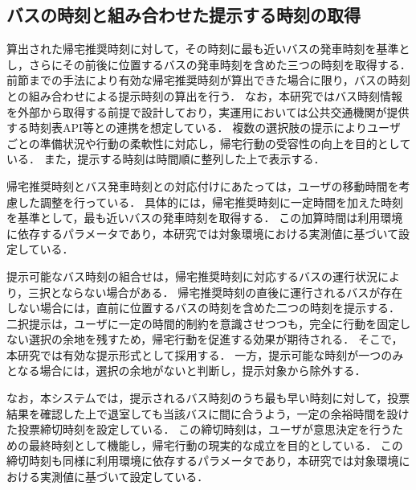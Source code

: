 \subsection{バスの時刻と組み合わせた提示する時刻の取得}
算出された帰宅推奨時刻に対して，その時刻に最も近いバスの発車時刻を基準とし，さらにその前後に位置するバスの発車時刻を含めた三つの時刻を取得する．
前節までの手法により有効な帰宅推奨時刻が算出できた場合に限り，バスの時刻との組み合わせによる提示時刻の算出を行う．
なお，本研究ではバス時刻情報を外部から取得する前提で設計しており，実運用においては公共交通機関が提供する時刻表API等との連携を想定している．
複数の選択肢の提示によりユーザごとの準備状況や行動の柔軟性に対応し，帰宅行動の受容性の向上を目的としている．
また，提示する時刻は時間順に整列した上で表示する．

帰宅推奨時刻とバス発車時刻との対応付けにあたっては，ユーザの移動時間を考慮した調整を行っている．
具体的には，帰宅推奨時刻に一定時間を加えた時刻を基準として，最も近いバスの発車時刻を取得する．
この加算時間は利用環境に依存するパラメータであり，本研究では対象環境における実測値に基づいて設定している．

提示可能なバス時刻の組合せは，帰宅推奨時刻に対応するバスの運行状況により，三択とならない場合がある．
帰宅推奨時刻の直後に運行されるバスが存在しない場合には，直前に位置するバスの時刻を含めた二つの時刻を提示する．
二択提示は，ユーザに一定の時間的制約を意識させつつも，完全に行動を固定しない選択の余地を残すため，帰宅行動を促進する効果が期待される．
そこで，本研究では有効な提示形式として採用する．
一方，提示可能な時刻が一つのみとなる場合には，選択の余地がないと判断し，提示対象から除外する．

なお，本システムでは，提示されるバス時刻のうち最も早い時刻に対して，投票結果を確認した上で退室しても当該バスに間に合うよう，一定の余裕時間を設けた投票締切時刻を設定している．
この締切時刻は，ユーザが意思決定を行うための最終時刻として機能し，帰宅行動の現実的な成立を目的としている．
この締切時刻も同様に利用環境に依存するパラメータであり，本研究では対象環境における実測値に基づいて設定している．